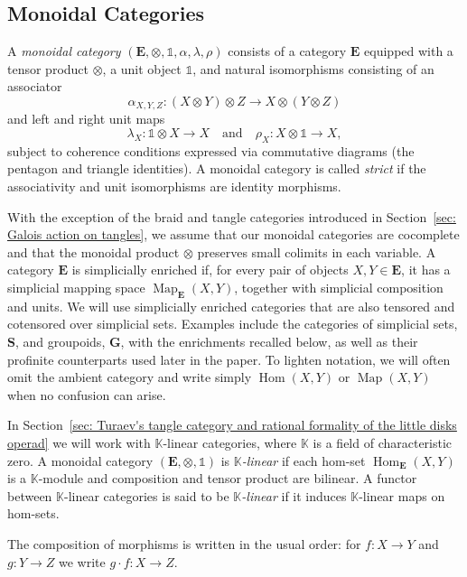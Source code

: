 \documentclass{amsart}
\newcommand{\bE}{\mathbf{E}}
\newcommand{\sSet}{\mathbf{S}}
\newcommand{\Grpd}{\mathbf{G}}
\newcommand{\kk}{\mathbb{K}}    %
\newcommand{\Hom}{\operatorname{Hom}}
\newcommand{\Map}{\operatorname{Map}}
\theoremstyle{definition}
\numberwithin{equation}{section}
\begin{document}
\subsection{Monoidal Categories}\label{subsec: tensor categories} 
A \emph{monoidal category} $(\bE, \otimes, \mathbb{1}, \alpha, \lambda, \rho)$ consists of a category $\bE$ equipped with a tensor product $\otimes$, a unit object $\mathbb{1}$, and natural isomorphisms consisting of an associator \[\alpha_{X,Y,Z} : (X \otimes Y) \otimes Z \to X \otimes (Y \otimes Z)\] and left and right unit maps \[\lambda_X : \mathbb{1} \otimes X \to X \quad \text{and
} \quad \rho_X : X \otimes \mathbb{1} \to X,\] subject to coherence conditions expressed via commutative diagrams (the pentagon and triangle identities). A monoidal category is called \emph{strict} if the associativity and unit isomorphisms are identity morphisms.%

With the exception of the braid and tangle categories introduced in
Section~\ref{sec: Galois action on tangles}, we assume that our
monoidal categories are cocomplete and that the monoidal product
$\otimes$ preserves small colimits in each variable. A category $\bE$ is simplicially enriched if, for every pair of
objects $X,Y\in\bE$, it has a simplicial mapping space
$\Map_{\bE}(X,Y)$, together with simplicial composition and units.
We will use simplicially enriched categories that are also tensored
and cotensored over simplicial sets. Examples include the categories
of simplicial sets, $\sSet$, and groupoids, $\Grpd$, with the
enrichments recalled below, as well as their profinite counterparts
used later in the paper. To lighten notation, we will often omit the
ambient category and write simply $\Hom(X,Y)$ or $\Map(X,Y)$ when no
confusion can arise.

In Section~\ref{sec: Turaev's tangle category and rational formality of the little disks operad} we will work with $\kk$-linear categories, where $\kk$ is a field of characteristic zero. A monoidal category $(\bE,\otimes,\mathbb{1})$ is \emph{$\kk$-linear} if each hom-set $\Hom_{\bE}(X,Y)$ is a
$\kk$-module and composition and tensor product are bilinear. A functor between $\kk$-linear categories is said to be \emph{$\kk$-linear} if it induces $\kk$-linear maps on hom-sets. 

The composition of morphisms is written in the usual order: for $f\colon X\to Y$ and $g\colon Y\to Z$ we write $g\cdot f\colon X\to Z$.
\end{document}
